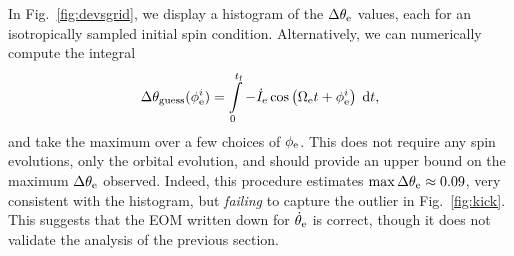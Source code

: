 \documentclass[11pt,
        usenames, %
        dvipsnames %
    ]{article}
\newcommand*{\p}[1]{\left(#1\right)}
\begin{document}
In Fig.~\ref{fig:devsgrid}, we display a histogram of the $\Delta \theta_{\rm
e}$ values, each for an isotropically sampled initial spin condition.
Alternatively, we can numerically compute the integral
\begin{equation}
    \Delta \theta_{\rm guess}(\phi_{\rm e}^i) = \int\limits_0^{t_{\rm f}}
        -\dot{I}_{\rm e} \cos \p{\Omega_{\rm e}t + \phi_{\rm
            e}^i}\;\mathrm{d}t,
\end{equation}
and take the maximum over a few choices of $\phi_{\rm e}$. This does not require
any spin evolutions, only the orbital evolution, and should provide an upper
bound on the maximum $\Delta \theta_{\rm e}$ observed. Indeed, this procedure
estimates $\max \Delta \theta_{\rm e} \approx 0.09$, very consistent with the
histogram, but \emph{failing} to capture the outlier in Fig.~\ref{fig:kick}.
This suggests that the EOM written down for $\dot{\theta}_{\rm e}$ is correct,
though it does not validate the analysis of the previous section.
\end{document}

